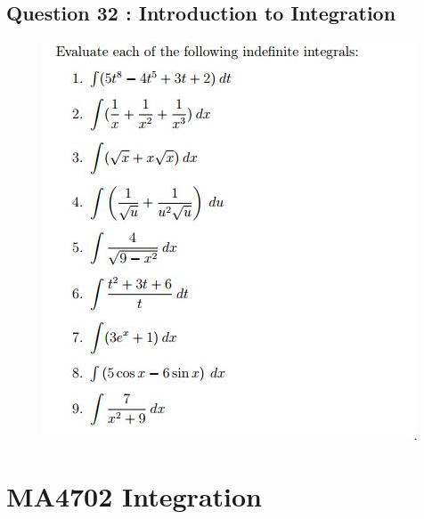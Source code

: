 \documentclass[]{article}
\begin{document}
\subsection*{Question 32 : Introduction to Integration}

\begin{figure}[h!]
	\centering
	\includegraphics[width=0.9\linewidth]{Question19integration1}
\end{figure}
\newpage
\section*{MA4702 Integration}
\end{document}
